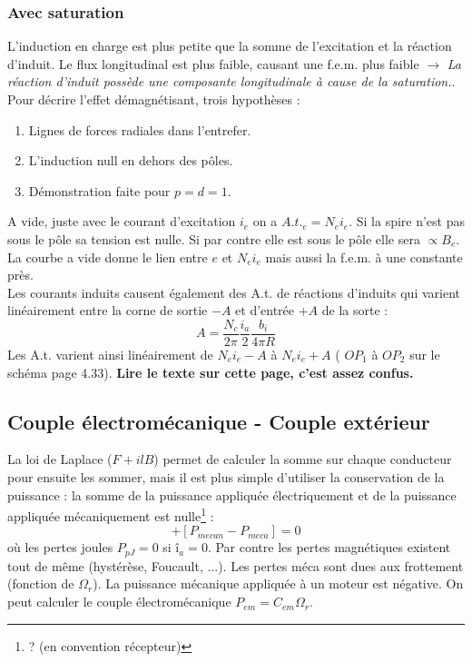 		\subsubsection{Avec saturation}
		L'induction en charge est plus petite que la somme de l'excitation 
		et la réaction d'induit. Le flux longitudinal est plus faible, 
		causant une f.e.m. plus faible $\rightarrow$\textit{ La réaction 
		d'induit possède une composante longitudinale à cause de la 
		saturation.}. Pour décrire l'effet démagnétisant, trois hypothèses :
		\begin{enumerate}
		\item Lignes de forces radiales dans l'entrefer.
		\item L'induction null en dehors des pôles.
		\item Démonstration faite pour $p=d=1$.
		\end{enumerate}
		A vide, juste avec le courant d'excitation $i_e$ on a $A.t._e = 
		N_ei_e$. Si la spire n'est pas sous le pôle sa tension est nulle. 
		Si par contre elle est sous le pôle elle sera $\propto B_e$. La 
		courbe a vide donne le lien entre $e$ et $N_ei_e$ mais aussi la 
		f.e.m. à une constante près.\\
		Les courants induits causent également des A.t. de réactions 
		d'induits qui varient linéairement entre la corne de sortie $-A$ 
		et d'entrée $+A$ de la sorte :
		\begin{equation}
		A = \frac{N_c}{2\pi}\frac{i_a}{2}\frac{b_i}{4\pi R}
		\end{equation}
		Les A.t. varient ainsi linéairement de $N_ei_e-A$ à $N_ei_e+A$ (
		$OP_1$ à $OP_2$ sur le schéma page 4.33). \textbf{Lire le texte 
		sur cette page, c'est assez confus.}
		
		\subsection{Couple électromécanique - Couple extérieur}
		La loi de Laplace ($F+ilB$) permet de calculer la somme sur 
		chaque conducteur pour ensuite les sommer, mais il est plus 
		simple d'utiliser la conservation de la puissance : la somme 
		de la puissance appliquée électriquement et de la puissance 
		appliquée mécaniquement est nulle\footnote{? (en convention 
		récepteur)} :
		\begin{equation}
		[\underbrace{P_{electrique} - (P_{pJoule}}_{P_{electromecanique}}
		+P_{pmagn})] + [P_{mecan}-P_{meca}]=0
		\end{equation}
		où les pertes joules $P_{pJ}=0$ si $î_a=0$. Par contre les pertes 
		magnétiques existent tout de même (hystérèse, Foucault, ...). Les 
		pertes méca sont dues aux frottement (fonction de $\Omega_r$). La 
		puissance mécanique appliquée à un moteur est négative. On peut 
		calculer le couple électromécanique $P_{em} = C_{em}\Omega_r$.\\
		
